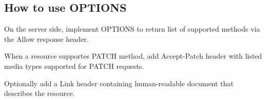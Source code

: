 \documentclass[11pt,a4paper]{article}
\begin{document}
\subsection{How to use OPTIONS}
On the server side, implement OPTIONS to return list of supported methods via the Allow response header.

When a resource supportes PATCH method, add Accept-Patch header with listed media types supported for PATCH requests.

Optionally add a Link header containing human-readable document that describes the resource.
\end{document}
